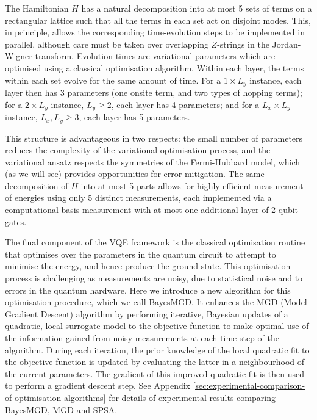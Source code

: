 \documentclass[aps,prb,twoside,superscriptaddress,longbibliography,nofootinbib,floatfix, notitlepage,twocolumn]{revtex4-1}
\begin{document}
The Hamiltonian $H$ has a natural decomposition into at most 5 sets of terms on a rectangular lattice
such that all the terms in each set act on disjoint modes. This, in principle, allows the corresponding time-evolution steps to be implemented in parallel, although care must be taken over overlapping $Z$-strings in the Jordan-Wigner transform. Evolution times are variational parameters which are optimised using a classical optimisation algorithm. Within each layer, the terms within each set evolve for the same amount of time. For a $1 \times L_y$ instance, each layer then has 3 parameters (one onsite term, and two types of hopping terms); for a $2\times L_y$ instance, $L_y \ge 2$, each layer has 4 parameters; and for a $L_x\times L_y$ instance, $L_x,L_y \ge 3$, each layer has 5 parameters.

This structure is advantageous in two respects: the small number of parameters reduces the complexity of the variational optimisation process, and the variational ansatz respects the symmetries of the Fermi-Hubbard model, which (as we will see) provides opportunities for error mitigation. 
The same decomposition of $H$ into at most 5 parts allows for highly efficient measurement of energies using only 5 distinct measurements, each implemented via a computational basis measurement with at most one additional layer of 2-qubit gates\cite{cade20}.

The final component of the VQE framework is the classical optimisation routine that optimises over the parameters in the quantum circuit to attempt to minimise the energy, and hence produce the ground state. This optimisation process is challenging as measurements are noisy, due to statistical noise and to errors in the quantum hardware. Here we introduce a new algorithm for this optimisation procedure, which we call BayesMGD. It enhances the MGD (Model Gradient Descent) algorithm\cite{sung20,GoogleQAOA_2021} by performing iterative, Bayesian updates of a quadratic, local surrogate model to
the objective function to make optimal use of the information gained from noisy measurements at each time step of the algorithm. During each iteration, the prior knowledge of the local 
quadratic fit to the objective function is updated by evaluating the latter in a neighbourhood of the current parameters. The gradient of this improved quadratic fit is then used to perform a gradient descent step. See Appendix \ref{sec:experimental-comparison-of-optimisation-algorithms} for details of experimental results comparing BayesMGD, MGD and SPSA.
\end{document}
